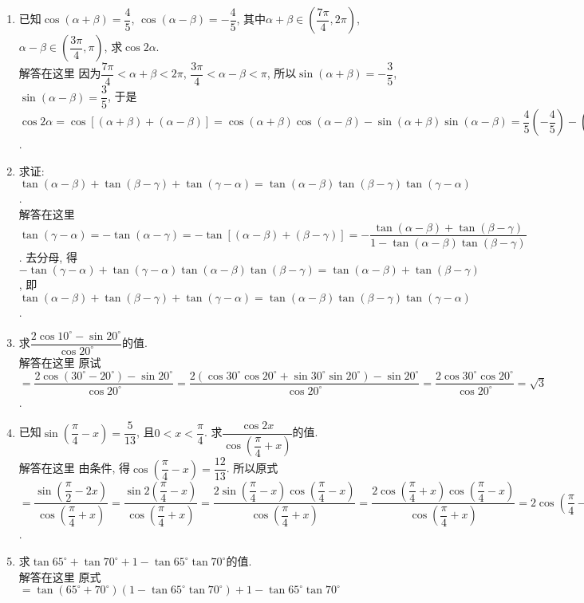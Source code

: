 \documentclass[10pt,a4paper]{article}
\begin{document}
\begin{enumerate}[1.]


\item 已知$\cos (\alpha +\beta)=\dfrac 45$, $\cos (\alpha -\beta)=-\dfrac 45$, 其中$\alpha +\beta \in (\dfrac{7\pi}4,2\pi)$, $\alpha -\beta \in (\dfrac{3\pi}4,\pi)$, 求$\cos 2\alpha$.\\
解答在这里   因为$ \dfrac{7\pi}4<\alpha +\beta <2\pi$, $\dfrac{3\pi}4<\alpha -\beta <\pi$, 所以$ \sin (\alpha +\beta)=-\dfrac 35$, $\sin (\alpha -\beta)=\dfrac 35$,
于是$\cos 2\alpha =\cos [(\alpha +\beta)+(\alpha -\beta)]=\cos (\alpha +\beta)\cos (\alpha -\beta)-\sin (\alpha +\beta)\sin (\alpha -\beta)=\dfrac 45(-\dfrac 45)-(-\dfrac 35)\times \dfrac 35=-\dfrac{16}{25}+\dfrac 9{25}=-\dfrac 7{25}$.
\item 求证: $\tan (\alpha -\beta)+\tan (\beta -\gamma)+\tan (\gamma -\alpha)=\tan (\alpha -\beta)\tan (\beta -\gamma)\tan (\gamma -\alpha)$.\\
解答在这里  $\tan (\gamma -\alpha)=-\tan (\alpha -\gamma)=-\tan [(\alpha -\beta)+(\beta -\gamma)]=-\dfrac{\tan (\alpha -\beta)+\tan (\beta -\gamma)}{1-\tan (\alpha -\beta)\tan (\beta -\gamma)}$.
去分母, 得$-\tan (\gamma -\alpha)+\tan (\gamma -\alpha)\tan (\alpha -\beta)\tan (\beta -\gamma)=\tan (\alpha -\beta)+\tan (\beta -\gamma)$,
即$\tan (\alpha -\beta)+\tan (\beta -\gamma)+\tan (\gamma -\alpha)=\tan (\alpha -\beta)\tan (\beta -\gamma)\tan (\gamma -\alpha)$.
\item 求$\dfrac{2\cos 10^\circ -\sin 20^\circ}{\cos 20^\circ}$的值.\\
解答在这里  原试$=\dfrac{2\cos (30^\circ -20^\circ)-\sin 20^\circ}{\cos 20^\circ}=\dfrac{2(\cos 30^\circ \cos 20^\circ +\sin 30^\circ \sin 20^\circ)-\sin 20^\circ}{\cos 20^\circ}=\dfrac{2\cos 30^\circ \cos 20^\circ}{\cos 20^\circ}=\sqrt 3$.
\item 已知$\sin (\dfrac{\pi}4-x)=\dfrac 5{13}$, 且$0<x<\dfrac{\pi}4$. 求$\dfrac{\cos 2x}{\cos (\dfrac{\pi}4+x)}$的值.\\
解答在这里  由条件, 得$\cos (\dfrac\pi 4-x)=\dfrac {12}{13}$.
所以原式$=\dfrac{\sin (\dfrac{\pi}2-2x)}{\cos (\dfrac{\pi}4+x)}=\dfrac{\sin 2(\dfrac{\pi}4-x)}{\cos (\dfrac{\pi}4+x)}=\dfrac{2\sin (\dfrac{\pi}4-x)\cos (\dfrac{\pi}4-x)}{\cos (\dfrac{\pi}4+x)}=\dfrac{2\cos (\dfrac\pi 4+x)\cos (\dfrac{\pi}4-x)}{\cos (\dfrac{\pi}4+x)}=2\cos (\dfrac{\pi}4-x)=\dfrac {24}{13}$.
\item 求$\tan 65^\circ +\tan 70^\circ +1-\tan 65^\circ \tan 70^\circ$的值.\\
解答在这里 原式$=\tan (65^\circ +70^\circ)(1-\tan 65^\circ \tan 70^\circ)+1-\tan 65^\circ \tan 70^\circ$

\end{enumerate}
\end{document}

